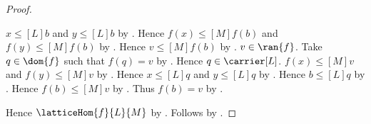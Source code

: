 \begin{proof}
\begin{subproof}
        $x\mathrel{\leq[L]}b$ and $y\mathrel{\leq[L]}b$ by
            .
        Hence $f(x)\mathrel{\leq[M]}f(b)$ and
            $f(y)\mathrel{\leq[M]}f(b)$ by
            .
        Hence $v\mathrel{\leq[M]}f(b)$ by
            .
        $v\in\ran{f}$.
        Take $q\in\dom{f}$ such that $f(q)=v$ by
            .
        Hence $q\in\carrier[L]$.
        $f(x)\mathrel{\leq[M]}v$ and
            $f(y)\mathrel{\leq[M]}v$ by
            .
        Hence $x\mathrel{\leq[L]}q$ and
            $y\mathrel{\leq[L]}q$ by
            .
        Hence $b\mathrel{\leq[L]}q$ by
            .
        Hence $f(b)\mathrel{\leq[M]}v$ by
            .
        Thus $f(b)=v$ by .
    \end{subproof}
    Hence $\latticeHom{f}{L}{M}$ by .
    Follows by .
\end{proof}

